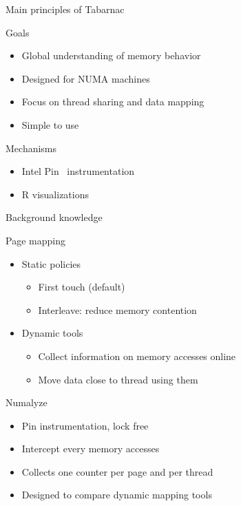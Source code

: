 \documentclass[xcolor={usenames,dvipsnames},hyperref={pdfusetitle}]{beamer}
\begin{document}
\begin{frame}{Main principles of Tabarnac}
    \begin{block}{Goals}
        \begin{itemize}
            \item Global understanding of memory behavior
            \item Designed for NUMA machines
            \item Focus on thread sharing and data mapping
            \item Simple to use
        \end{itemize}
    \end{block}
    \pause
    \begin{exampleblock}{Mechanisms}
        \begin{itemize}
            \item Intel Pin~\cite{Luk05Pin} instrumentation
            \item R visualizations
        \end{itemize}
    \end{exampleblock}
\end{frame}

\begin{frame}{Background knowledge}
    \begin{block}{Page mapping}
        \begin{itemize}
            \item  Static policies
                \begin{itemize}
                    \item First touch (default)
                    \item Interleave: reduce memory contention
                \end{itemize}
            \item Dynamic tools~\cite{Corbet12Toward,Diener14kMAF}
                \begin{itemize}
                    \item Collect information on memory accesses online
                    \item Move data close to thread using them
                \end{itemize}
        \end{itemize}
    \end{block}
    \pause
    \begin{exampleblock}{Numalyze~\cite{Diener15Characterizing}}
        \begin{itemize}
            \item Pin instrumentation, lock free
            \item Intercept every memory accesses
            \item Collects one counter per page and per thread
            \item Designed to compare dynamic mapping tools
        \end{itemize}
    \end{exampleblock}
\end{frame}
\end{document}
